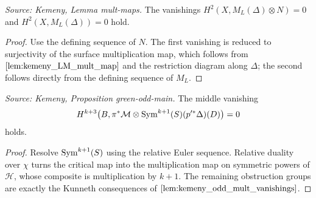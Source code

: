 \begin{lemma}
  \label{lem:kemeny_odd_mult_vanishings}
  \textit{Source: Kemeny, Lemma mult-maps.}
  The vanishings
  \(H^2(X,M_L(\Delta)\otimes N)=0\) and \(H^2(X,M_L(\Delta))=0\) hold.
\end{lemma}
\begin{proof}
  Use the defining sequence of \(N\).  The first vanishing is reduced to
  surjectivity of the surface multiplication map, which follows from
  \(\cref{lem:kemeny_LM_mult_map}\) and the restriction diagram along
  \(\Delta\); the second follows directly from the defining sequence of \(M_L\).
\end{proof}

\begin{proposition}[Odd \(i=k+1\) vanishing]
  \label{prop:kemeny_green_odd_main}
  \textit{Source: Kemeny, Proposition green-odd-main.}
  The middle vanishing
  \[
    H^{k+3}\bigl(B,\pi^*\mathcal M\otimes\mathrm{Sym}^{k+1}(S)(p'^*\Delta)(D)\bigr)=0
  \]
  holds.
\end{proposition}
\begin{proof}
  Resolve \(\mathrm{Sym}^{k+1}(S)\) using the relative Euler sequence.  Relative duality
  over \(\chi\) turns the critical map into the multiplication map on symmetric
  powers of \(\mathcal H\), whose composite is multiplication by \(k+1\).  The
  remaining obstruction groups are exactly the Kunneth consequences of
  \(\cref{lem:kemeny_odd_mult_vanishings}\).
\end{proof}

